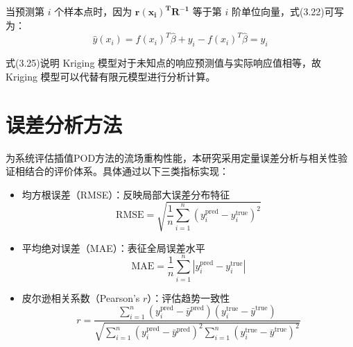 当预测第 $i$ 个样本点时，因为 $\mathbf{r(x_i)^T R^{-1}}$ 等于第 $i$ 阶单位向量，式(3.22)可写为：
\begin{equation}
    \hat{y}(x_i) = f(x_i)^T \hat{\beta} + y_i - f(x_i)^T \hat{\beta} = y_i
    \label{eq:2.14}
\end{equation}

式(3.25)说明 Kriging 模型对于未知点的响应预测值与实际响应值相等，故 Kriging
模型可以代替有限元模型进行分析计算。 \cite{1025273058.nh}
\section{误差分析方法}
\label{sec:4.1}
为系统评估插值POD方法的流场重构性能，本研究采用定量误差分析与相关性验证相结合的评价体系。具体通过以下三类指标实现：

\begin{itemize}
    \item {均方根误差（RMSE）}：反映局部大误差分布特征
    \begin{equation}
        \text{RMSE} = \sqrt{\frac{1}{n} \sum_{i=1}^{n} \left( y_i^{\text{pred}} - y_i^{\text{true}} \right)^2}
        \label{eq:rmse}
    \end{equation}

    \item{平均绝对误差（MAE）}：表征全局误差水平
    \begin{equation}
        \text{MAE} = \frac{1}{n} \sum_{i=1}^{n} \left| y_i^{\text{pred}} - y_i^{\text{true}} \right|
        \label{eq:mae}
    \end{equation}

    \item{皮尔逊相关系数（Pearson's $r$）}：评估趋势一致性
    \begin{equation}
        r = \frac{\sum_{i=1}^{n} (y_i^{\text{pred}} - \bar{y}^{\text{pred}})(y_i^{\text{true}} - \bar{y}^{\text{true}})}
        {\sqrt{\sum_{i=1}^{n} (y_i^{\text{pred}} - \bar{y}^{\text{pred}})^2 \sum_{i=1}^{n} (y_i^{\text{true}} - \bar{y}^{\text{true}})^2}}
        \label{eq:pearson}
    \end{equation}
\end{itemize}





